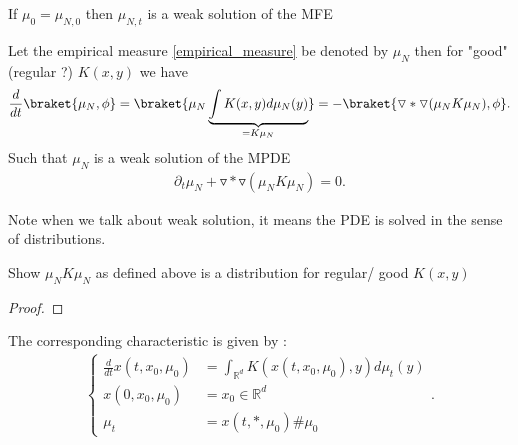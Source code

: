 \begin{remark}
  If $\mu_0 = \mu_{N,0}$  then $\mu_{N,t}$ is a weak solution of the MFE
\end{remark}
\begin{theorem}
Let the empirical measure \ref{empirical_measure} be denoted by $\mu_N$ then for "good" (regular ?)  $K(x,y)$ we have 
\begin{align*}
  \frac{d}{dt} \braket{\mu_N,\phi } = \braket{\mu_N \underbrace{\int K(x,y) d\mu_N(y)}_{=  K \mu_N}}= -\braket{\triangledown * \triangledown(\mu_N K\mu_N),\phi }
.\end{align*}
Such that $\mu_N$ is a weak solution of the MPDE
\begin{align*}
  \partial_t \mu_N + \triangledown * \triangledown(\mu_N K\mu_N) = 0
.\end{align*}  
\end{theorem}
\begin{remark}
 Note when we talk about weak solution, it means the PDE is solved in the sense of distributions.
\end{remark}
\begin{exercise}
 Show $\mu_N K \mu_N$ as defined above is a distribution for regular/ good $K(x,y)$
\end{exercise}
\begin{proof}
  
\end{proof}
\begin{definition}
  The corresponding characteristic is given by : 
\begin{align*}  
  \begin{cases}
    \frac{d}{dt} x(t,x_0,\mu_0) &= \int_{\mathbb{R}^{d } } K(x(t,x_0,\mu_0),y) d\mu_t(y)\\
    x(0,x_0,\mu_0) &= x_0 \in  \mathbb{R}^{d }  \\
    \mu_t &= x(t,*,\mu_0) \# \mu_0 
  \end{cases}
.\end{align*}
\end{definition}
